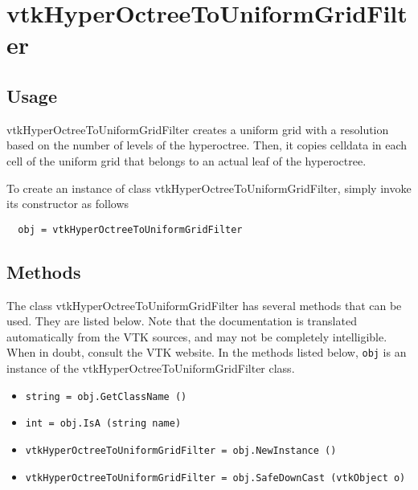 \section{vtkHyperOctreeToUniformGridFilter}

\subsection{Usage}

 vtkHyperOctreeToUniformGridFilter creates a uniform grid with a resolution
 based on the number of levels of the hyperoctree. Then, it copies celldata
 in each cell of the uniform grid that belongs to an actual leaf of the
 hyperoctree.


To create an instance of class vtkHyperOctreeToUniformGridFilter, simply
invoke its constructor as follows
\begin{verbatim}
  obj = vtkHyperOctreeToUniformGridFilter
\end{verbatim}
\subsection{Methods}

The class vtkHyperOctreeToUniformGridFilter has several methods that can be used.
  They are listed below.
Note that the documentation is translated automatically from the VTK sources,
and may not be completely intelligible.  When in doubt, consult the VTK website.
In the methods listed below, \verb|obj| is an instance of the vtkHyperOctreeToUniformGridFilter class.
\begin{itemize}
\item  \verb|string = obj.GetClassName ()|

\item  \verb|int = obj.IsA (string name)|

\item  \verb|vtkHyperOctreeToUniformGridFilter = obj.NewInstance ()|

\item  \verb|vtkHyperOctreeToUniformGridFilter = obj.SafeDownCast (vtkObject o)|

\end{itemize}
